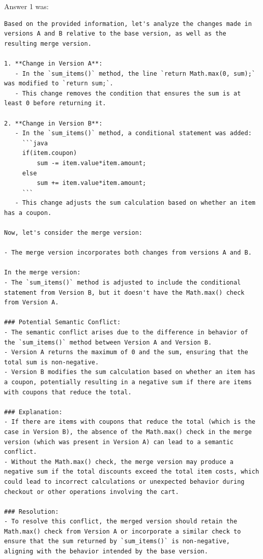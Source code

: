 Answer 1 was:
\begin{lstlisting}
Based on the provided information, let's analyze the changes made in versions A and B relative to the base version, as well as the resulting merge version.

1. **Change in Version A**:
   - In the `sum_items()` method, the line `return Math.max(0, sum);` was modified to `return sum;`.
   - This change removes the condition that ensures the sum is at least 0 before returning it.

2. **Change in Version B**:
   - In the `sum_items()` method, a conditional statement was added:
     ```java
     if(item.coupon)
         sum -= item.value*item.amount;
     else
         sum += item.value*item.amount;
     ```
   - This change adjusts the sum calculation based on whether an item has a coupon.

Now, let's consider the merge version:

- The merge version incorporates both changes from versions A and B.

In the merge version:
- The `sum_items()` method is adjusted to include the conditional statement from Version B, but it doesn't have the Math.max() check from Version A.

### Potential Semantic Conflict:
- The semantic conflict arises due to the difference in behavior of the `sum_items()` method between Version A and Version B.
- Version A returns the maximum of 0 and the sum, ensuring that the total sum is non-negative.
- Version B modifies the sum calculation based on whether an item has a coupon, potentially resulting in a negative sum if there are items with coupons that reduce the total.

### Explanation:
- If there are items with coupons that reduce the total (which is the case in Version B), the absence of the Math.max() check in the merge version (which was present in Version A) can lead to a semantic conflict.
- Without the Math.max() check, the merge version may produce a negative sum if the total discounts exceed the total item costs, which could lead to incorrect calculations or unexpected behavior during checkout or other operations involving the cart.

### Resolution:
- To resolve this conflict, the merged version should retain the Math.max() check from Version A or incorporate a similar check to ensure that the sum returned by `sum_items()` is non-negative, aligning with the behavior intended by the base version.
\end{lstlisting}

